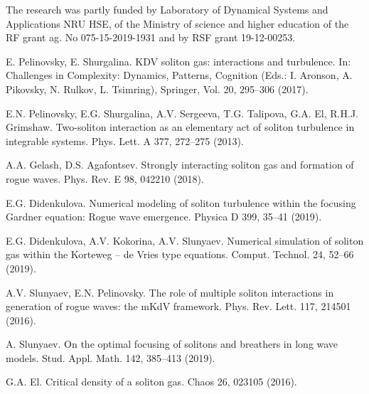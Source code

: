 \documentclass[12pt]{article}
\begin{document}
The research was partly funded by Laboratory of Dynamical Systems and Applications NRU HSE, of the Ministry of science and higher education of the RF grant ag. No 075-15-2019-1931 and by RSF grant 19-12-00253.

\begin{thebibliography}{99}

E. Pelinovsky, E. Shurgalina. KDV soliton gas: interactions and turbulence. In: Challenges in Complexity: Dynamics, Patterns, Cognition (Eds.: I. Aronson, A. Pikovsky, N. Rulkov, L. Tsimring), Springer, Vol. 20, 295--306 (2017).

E.N. Pelinovsky, E.G. Shurgalina, A.V. Sergeeva, T.G. Talipova,
G.A. El, R.H.J. Grimshaw.
Two-soliton interaction as an elementary act of soliton turbulence
in integrable systems.
Phys. Lett. A 377, 272--275 (2013).

A.A. Gelash, D.S. Agafontsev. Strongly interacting soliton gas and formation of rogue
waves. Phys. Rev. E 98, 042210 (2018).

E.G. Didenkulova. Numerical modeling of soliton turbulence within the focusing Gardner equation: Rogue wave emergence. Physica D 399, 35--41 (2019).

E.G. Didenkulova, A.V. Kokorina, A.V. Slunyaev. Numerical simulation of soliton gas within the Korteweg -- de Vries type equations. Comput. Technol. 24, 52--66 (2019).

A.V. Slunyaev, E.N. Pelinovsky. The role of multiple soliton interactions in generation of rogue waves: the mKdV framework. Phys. Rev. Lett. 117, 214501 (2016).

A. Slunyaev. On the optimal focusing of solitons and breathers in long wave models. Stud. Appl. Math. 142, 385--413 (2019).

G.A. El. Critical density of a soliton gas. Chaos 26, 023105 (2016).
	
\end{thebibliography}
\end{document}
